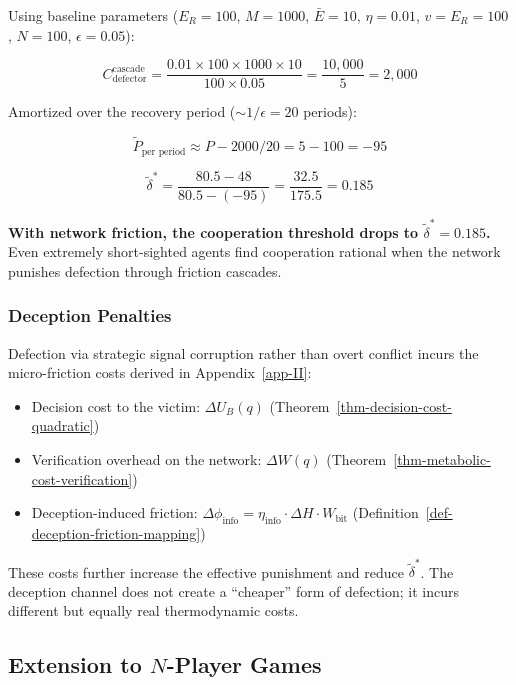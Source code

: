 \documentclass[11pt]{article}
\theoremstyle{plain}
\theoremstyle{definition}
\theoremstyle{remark}
\let\origsubsection\subsection
\renewcommand{\subsection}{\needspace{7\baselineskip}\origsubsection}
\let\origsubsubsection\subsubsection
\renewcommand{\subsubsection}{\needspace{4\baselineskip}\origsubsubsection}
\providecommand{\tightlist}{%
  \setlength{\itemsep}{0pt}\setlength{\parskip}{0pt}}
\begin{document}
Using baseline parameters (\(E_R = 100\), \(M = 1000\),
\(\bar{E} = 10\), \(\eta = 0.01\), \(v = E_R = 100\), \(N = 100\),
\(\epsilon = 0.05\)):

\[C_{\text{defector}}^{\text{cascade}} = \frac{0.01 \times 100 \times 1000 \times 10}{100 \times 0.05} = \frac{10{,}000}{5} = 2{,}000\]

Amortized over the recovery period (\(\sim 1/\epsilon = 20\) periods):

\[\tilde{P}_{\text{per period}} \approx P - 2000/20 = 5 - 100 = -95\]

\[\tilde{\delta}^* = \frac{80.5 - 48}{80.5 - (-95)} = \frac{32.5}{175.5} = 0.185\]

\textbf{With network friction, the cooperation threshold drops to
\(\tilde{\delta}^* = 0.185\).} Even extremely short-sighted agents find
cooperation rational when the network punishes defection through
friction cascades.

\subsubsection{Deception Penalties}\label{deception-penalties}

Defection via strategic signal corruption rather than overt conflict
incurs the micro-friction costs derived in Appendix~\ref{app-II}:

\begin{itemize}
\tightlist
\item
  Decision cost to the victim: \(\Delta U_B(q)\)
  (Theorem~\ref{thm-decision-cost-quadratic})
\item
  Verification overhead on the network: \(\Delta W(q)\)
  (Theorem~\ref{thm-metabolic-cost-verification})
\item
  Deception-induced friction:
  \(\Delta\phi_{\text{info}} = \eta_{\text{info}} \cdot \Delta H \cdot W_{\text{bit}}\)
  (Definition~\ref{def-deception-friction-mapping})
\end{itemize}

These costs further increase the effective punishment and reduce
\(\tilde{\delta}^*\). The deception channel does not create a
``cheaper'' form of defection; it incurs different but equally real
thermodynamic costs.

\subsection{\texorpdfstring{Extension to \(N\)-Player
Games}{Extension to N-Player Games}}\label{extension-to-n-player-games}
\end{document}
